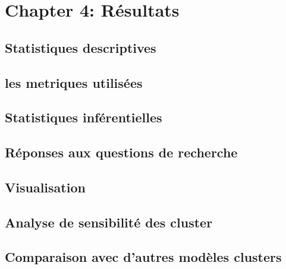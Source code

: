 \chapter{Chapter 4: Résultats}

\section{Statistiques descriptives }
\section{les metriques utilisées }
\section{Statistiques inférentielles}
\section{Réponses aux questions de recherche}
\section{Visualisation}
\section{Analyse de sensibilité des cluster}
\section{Comparaison avec d'autres modèles clusters } 
